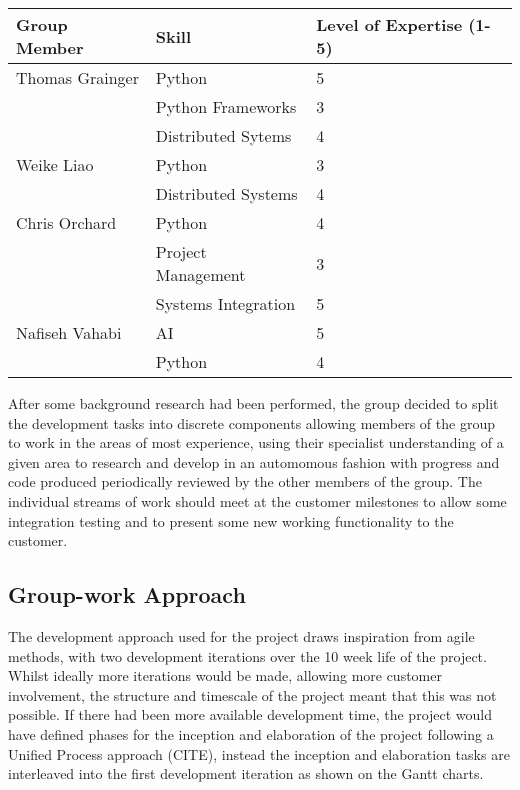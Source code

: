 \begin{center}
\begin{tabularx}{\linewidth}{|XXX|}
\hline
Group Member & Skill & Level of Expertise (1-5) \\ \hline
Thomas Grainger & Python & 5 \\
& Python Frameworks & 3 \\
& Distributed Sytems & 4 \\ \hline
Weike Liao & Python & 3 \\
& Distributed Systems & 4 \\ \hline
Chris Orchard & Python & 4 \\
& Project Management & 3 \\
& Systems Integration & 5 \\ \hline
Nafiseh Vahabi & AI & 5 \\
& Python & 4 \\
\hline
\end{tabularx}
\end{center}

After some background research had been performed, the group decided to split
the development tasks into discrete components allowing members of the group to
work in the areas of most experience, using their specialist understanding of a
given area to research and develop in an automomous fashion with progress and
code produced periodically reviewed by the other members of the group. The
individual streams of work should meet at the customer milestones to allow some
integration testing and to present some new working functionality to the
customer.

\subsection{Group-work Approach}
The development approach used for the project draws inspiration from agile
methods, with two
development iterations over the 10 week life of the project. Whilst ideally more
iterations would be made, allowing more customer involvement, the
structure and timescale of the project meant that this was not possible. If
there had been more available development time, the project would have defined
phases for the inception and elaboration of the project following a Unified
Process approach (CITE), instead the inception and elaboration tasks are
interleaved into the first development iteration as shown on the Gantt charts. 

